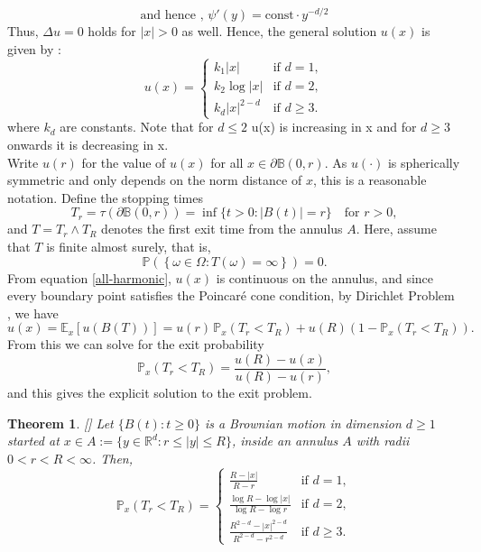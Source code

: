 \documentclass[11pt, a4paper, oneside]{report}
\numberwithin{equation}{section}
\newtheorem{theorem}{Theorem}[chapter]
\begin{document}
\[
\text{and hence , } \psi'(y) = \text{const} \cdot y^{-d/2}
\]
\noindent Thus, \( \Delta u = 0 \) holds for \( |x| > 0 \) as well.
Hence, the general solution \( u(x) \) is given by :
\begin{equation}\label{all-harmonic}
u(x) = 
\begin{cases}
k_1|x| & \text{if } d = 1, \\
k_2\log |x| & \text{if } d = 2, \\
k_d|x|^{2 - d} & \text{if } d \geq 3.
\end{cases}
\end{equation}
where \(k_d \) are constants. Note that for \(d \leq 2\) u(x) is increasing in x and for \(d \geq 3\) onwards it is decreasing in x.\\
Write \( u(r) \) for the value of \( u(x) \) for all \( x \in \partial \mathbb{B}(0, r) \). As \( u(\cdot) \) is spherically symmetric and only depends on the norm distance of \( x \), this is a reasonable notation. Define the stopping times
\[
T_r = \tau(\partial \mathbb{B}(0, r)) = \inf \{ t > 0 : |B(t)| = r \} \quad \text{for } r > 0,
\]
and \( T = T_r \wedge T_R \) denotes  the first exit time from the annulus \( A \). Here, assume that \( T \) is finite almost surely, that is,
\[
\mathbb{P}\left( \left\{ \omega \in \Omega : T(\omega) = \infty \right\} \right) = 0.
\]
From equation \eqref{all-harmonic}, \( u(x) \) is continuous on the annulus, and since every boundary point satisfies the Poincaré cone condition, by Dirichlet Problem , we have
\[
u(x) = \mathbb{E}_x \left[ u(B(T)) \right] = u(r) \, \mathbb{P}_x(T_r < T_R) + u(R)\left(1 - \mathbb{P}_x(T_r < T_R)\right).
\]
From this we can solve for the exit probability
\[
\mathbb{P}_x(T_r < T_R) = \frac{u(R) - u(x)}{u(R) - u(r)},
\]
and this gives the explicit solution to the exit problem.
\begin{theorem}\label{exit-annulus}
[{\cite[Theorem 3.18]{PeresMortersBook}}]
Let \( \{B(t) : t \geq 0\} \) is a Brownian motion in dimension \( d \geq 1 \) started at \( x \in A := \{y \in \mathbb{R}^d : r \leq |y| \leq R \} \), inside an annulus \( A \) with radii \( 0 < r < R < \infty \). Then,
\begin{equation}
\mathbb{P}_x(T_r < T_R) =
\begin{cases}
\displaystyle \frac{R - |x|}{R - r} & \text{if } d = 1, \\[10pt]
\displaystyle \frac{\log R - \log |x|}{\log R - \log r} & \text{if } d = 2, \\[10pt]
\displaystyle \frac{R^{2 - d} - |x|^{2 - d}}{R^{2 - d} - r^{2 - d}} & \text{if } d \geq 3.
\end{cases}
\end{equation}

\end{theorem}
\end{document}
